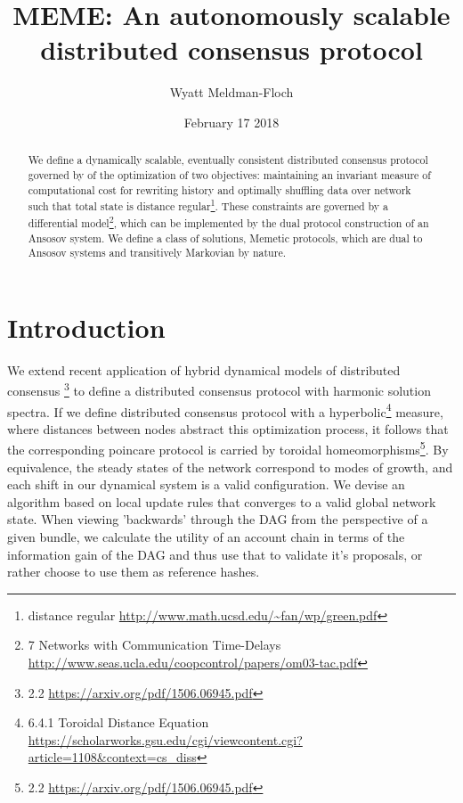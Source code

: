 \documentclass{article}
\title{MEME: An autonomously scalable  distributed consensus protocol}
\author{Wyatt Meldman-Floch}
\date{February 17 2018}
\begin{document}
\maketitle

\begin{abstract}
We define a dynamically scalable, eventually consistent distributed consensus protocol governed by of the optimization of two objectives: maintaining an invariant measure of computational cost for rewriting history and optimally shuffling data over network such that total state is distance regular\footnote{distance regular \url{http://www.math.ucsd.edu/~fan/wp/green.pdf}}. These constraints are governed by a differential model\footnote{7 Networks with Communication Time-Delays \url{http://www.seas.ucla.edu/coopcontrol/papers/om03-tac.pdf}}, which can be implemented by the dual protocol construction of an Ansosov system. We define a class of solutions, Memetic protocols, which are dual to Ansosov systems and transitively Markovian by nature.

\end{abstract}
\setcounter{secnumdepth}{0}
\section{Introduction}
We extend recent application of hybrid dynamical models of distributed consensus \footnote{2.2 \url{https://arxiv.org/pdf/1506.06945.pdf}} to define a distributed consensus protocol with harmonic solution spectra. If we define distributed consensus protocol with a hyperbolic\footnote{6.4.1 Toroidal Distance Equation \url{https://scholarworks.gsu.edu/cgi/viewcontent.cgi?article=1108&context=cs_diss}} measure, where distances between nodes abstract this optimization process, it follows that the corresponding poincare protocol is carried by toroidal homeomorphisms\footnote{2.2 \url{https://arxiv.org/pdf/1506.06945.pdf}}. By equivalence, the steady states of the network correspond to modes of growth, and each shift in our dynamical system is a valid configuration. We devise an algorithm based on local update rules that converges to a valid global network state. When viewing 'backwards' through the DAG from the perspective of a given bundle, we calculate the utility of an account chain in terms of the information gain of the DAG and thus use that to validate it's proposals, or rather choose to use them as reference hashes.
\end{document}
